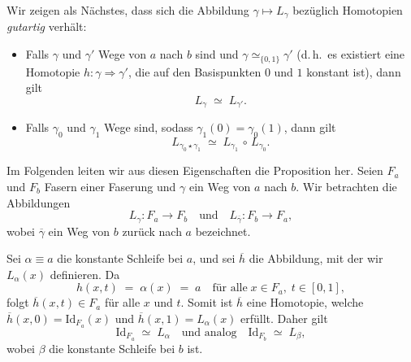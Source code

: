 \documentclass[12pt, hidelinks]{article}
\numberwithin{conj}{section}
\begin{document}
                
                Wir zeigen als Nächstes, dass sich die Abbildung \(\gamma \mapsto L_\gamma\) bezüglich Homotopien \cite[Prop.~4.61]{hatcher2001} \emph{gutartig} verhält:
                \begin{itemize}[noitemsep]
                    \item Falls \(\gamma\) und \(\gamma'\) Wege von \(a\) nach \(b\) sind und
                          \(\gamma \simeq_{\{0,1\}} \gamma'\)
                          (d.\,h.\ es existiert eine Homotopie \(h : \gamma \Rightarrow \gamma'\), die auf den Basispunkten \(0\) und \(1\) konstant ist), dann gilt
                          \[
                            L_\gamma \;\simeq\; L_{\gamma'}.
                          \]
                    \item Falls \(\gamma_0\) und \(\gamma_1\) Wege sind, sodass \(\gamma_1(0) = \gamma_0(1)\), dann gilt
                          \[
                            L_{\gamma_0 \star \gamma_1}
                            \;\simeq\;
                            L_{\gamma_1} \,\circ\, L_{\gamma_0}.
                          \]
                \end{itemize}
                Im Folgenden leiten wir aus diesen Eigenschaften die Proposition her. Seien \(F_a\) und \(F_b\) Fasern einer Faserung und \(\gamma\) ein Weg von \(a\) nach \(b\). Wir betrachten die Abbildungen
                \[
                    L_\gamma : F_a \longrightarrow F_b
                    \quad\text{und}\quad
                    L_{\overline{\gamma}} : F_b \longrightarrow F_a,
                \]
                wobei \(\overline{\gamma}\) ein Weg von \(b\) zurück nach \(a\) bezeichnet.
                
                \smallskip
                
                Sei \(\alpha \equiv a\) die konstante Schleife bei \(a\), und sei \(\overline{h}\) die Abbildung, mit der wir \(L_\alpha(x)\) definieren. Da
                \[
                    h(x,t) \;=\; \alpha(x) \;=\; a
                    \quad\text{für alle}\;
                    x\in F_a,\; t\in [0,1],
                \]
                folgt \(\overline{h}(x,t) \in F_a\) für alle \(x\) und \(t\). Somit ist \(\overline{h}\) eine Homotopie, welche \(\overline{h}(x,0) = \mathrm{Id}_{F_a}(x)\) und \(\overline{h}(x,1) = L_\alpha(x)\) erfüllt. Daher gilt
                \[
                    \mathrm{Id}_{F_a}
                    \;\simeq\;
                    L_\alpha
                    \quad\text{und analog}\quad
                    \mathrm{Id}_{F_b}
                    \;\simeq\;
                    L_\beta,
                \]
                wobei \(\beta\) die konstante Schleife bei \(b\) ist.
                
\end{document}

